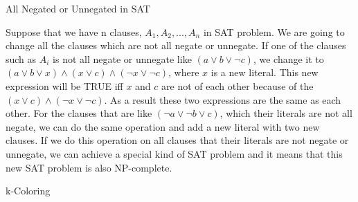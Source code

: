 \documentclass[12pt]{article}
\newenvironment{solution}[2][Solution]{\begin{trivlist}
\item[\hskip \labelsep {\bfseries #1}]}{\end{trivlist}}
\newenvironment{problem}[2][Problem]{\begin{trivlist}
\item[\hskip \labelsep {\bfseries #1}\hskip \labelsep {\bfseries #2.}]}{\end{trivlist}}
\begin{document}
\begin{problem}{3}
All Negated or Unnegated in SAT
\end{problem}

\begin{solution}{}
Suppose that we have n clauses, $A_1, A_2, ..., A_n$ in SAT problem. We are going to change
all the clauses which are not all negate or unnegate. If one of the clauses such as $A_i$
is not all negate or unnegate like $(a \vee b \vee \neg c)$, we change it to $(a \vee b \vee x)
\wedge (x \vee c) \wedge (\neg x \vee \neg c)$, where $x$ is a new literal. This new expression
will be TRUE iff $x$ and $c$ are not of each other because of the $(x \vee c) \wedge (\neg x \vee
\neg c)$. As a result these two expressions are the same as each other. For the clauses that
are like $(\neg a \vee \neg b \vee c)$, which their literals are not all negate, we can
do the same operation and add a new literal with two new clauses. If we do this operation
on all clauses that their literals are not negate or unnegate, we can achieve a special
kind of SAT problem and it means that this new SAT problem is also NP-complete.
\end{solution}


\begin{problem}{4}
k-Coloring
\end{problem}
\end{document}
